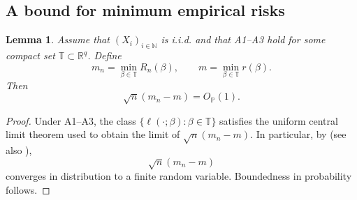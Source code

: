 \documentclass[12pt]{article}
\newtheorem{lemma}{Lemma}
\theoremstyle{remark}
\theoremstyle{plain}
\begin{document}
\subsection{A bound for minimum empirical risks}
\label{App: rootn-mer}

\begin{lemma}
\label{Lem: rootn-mer}
Assume that $(X_i)_{i\in\mathbb{N}}$ is i.i.d. and that A1--A3 hold for some compact set $\mathbb{T}\subset\mathbb{R}^{q}$. Define
\[
m_n = \min_{\beta\in\mathbb{T}} R_n(\beta),\qquad m = \min_{\beta\in\mathbb{T}} r(\beta).
\]
Then
\[
\sqrt{n}\left(m_n-m\right)=O_{\mathbb{P}}(1).
\]
\end{lemma}

\begin{proof}
Under A1--A3, the class $\{\ell(\cdot;\beta):\beta\in\mathbb{T}\}$ satisfies the uniform central limit theorem used to obtain the limit of $\sqrt n(m_n-m)$. In particular, by \citet[Lemma 1]{nguyen_panic:_2023} (see also \citet[Fact 4.1]{pmlr-v235-westerhout24a}),
\[
\sqrt{n}\left(m_n-m\right)
\]
converges in distribution to a finite random variable. Boundedness in probability follows.
\end{proof}
\end{document}
